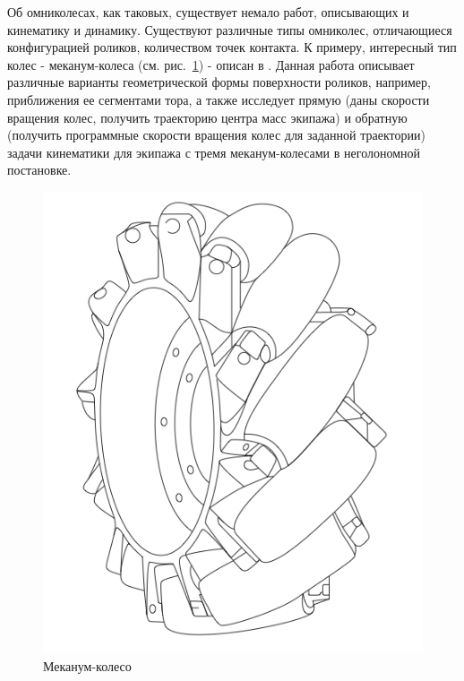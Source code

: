 \documentclass[12pt]{article}
\begin{document}
Об омниколесах, как таковых, существует немало работ, описывающих и кинематику и динамику. Существуют различные типы омниколес, отличающиеся конфигурацией роликов, количеством точек контакта. К примеру, интересный тип колес - меканум-колеса (см. рис.~\ref{fig:bor_wheel_pic}) - описан в \cite{mecanum}. Данная работа описывает различные варианты геометрической формы поверхности роликов, например, приближения ее сегментами тора, а также исследует прямую (даны скорости вращения колес, получить траекторию центра масс экипажа) и обратную (получить программные скорости вращения колес для заданной траектории) задачи кинематики для экипажа с тремя меканум-колесами в неголономной постановке.\\

\begin{figure}
\centering
\begin{minipage}{.47\textwidth}
    \centering
    \includegraphics[width=\textwidth]{img/art/bor_wheel_pic.png}
    \caption{Меканум-колесо}
    \label{fig:bor_wheel_pic}
\end{minipage}%
\hspace{5pt}

\end{figure}
\end{document}
